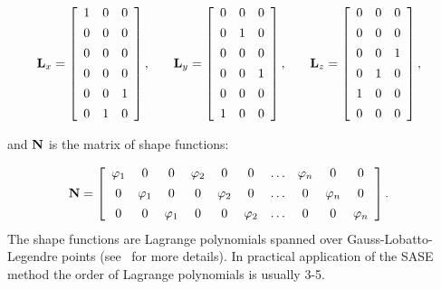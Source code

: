 \begin{equation}
	 \begin{split}
		 & \mathbf{L}_x = \left[\begin{array}{ccc} 
		 1 & 0 & 0  \\[4pt]
		 0&0&0\\[4pt]
		 0 &0&0  \\[4pt]
		 0&0&0\\[4pt]
		 0&0&1\\[4pt]
		  0&1&0 
		 \end{array} \right], 
	 \end{split} \quad 
	  \begin{split}
		  & \mathbf{L}_y = \left[\begin{array}{ccc} 
		 0&0&0\\[4pt]
		 0&1&0\\[4pt]
		 0 &0&0\\[4pt]
		 0&0&1\\[4pt]
		 0&0&0\\[4pt]
		 1&0&0 
		 \end{array} \right],
	 \end{split} \quad 
	 \begin{split}
	& \mathbf{L}_z = \left[\begin{array}{ccc} 
	0&0&0\\[4pt]
	0&0&0\\[4pt]
	0 &0&1\\[4pt]
	0&1&0\\[4pt]
	1&0&0\\[4pt]
	0&0&0 
	\end{array} \right],
	\end{split}
	\label{eq:selectors}\end{equation}

	 and \(\mathbf{N}\) is the matrix of shape functions:
	  
\begin{equation}
	 \begin{split}
	 & \mathbf{N} = \left[\begin{array}{cccccccccc} 
	 \varphi_1 & 0 & 0  & \varphi_2 & 0 & 0& \ldots & \varphi_n & 0 & 0\\[4pt]
	 0&\varphi_1&0 &  0&\varphi_2&0 & \ldots&  0&\varphi_n&0\\[4pt]
	 0 &0&\varphi_1 & 0 &0&\varphi_2 & \ldots& 0 &0&\varphi_n 
	 \end{array} \right]. 
	 \end{split}
	 \end{equation}
	 The shape functions are Lagrange polynomials spanned over Gauss-Lobatto-Legendre points (see~\cite{Kudela2007} for more details). In practical application of the SASE method the order of Lagrange polynomials is usually 3-5.
	 

